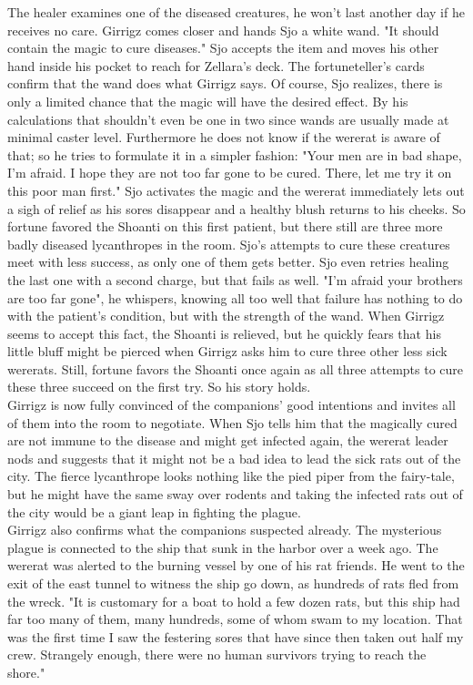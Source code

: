 The healer examines one of the diseased creatures, he won't last another day if he receives no care. Girrigz comes closer and hands Sjo a white wand. "It should contain the magic to cure diseases." Sjo accepts the item and moves his other hand inside his pocket to reach for Zellara's deck. The fortuneteller's cards confirm that the wand does what Girrigz says. Of course, Sjo realizes, there is only a limited chance that the magic will have the desired effect. By his calculations that shouldn't even be one in two since wands are usually made at minimal caster level. Furthermore he does not know if the wererat is aware of that; so he tries to formulate it in a simpler fashion: "Your men are in bad shape, I'm afraid. I hope they are not too far gone to be cured. There, let me try it on this poor man first." Sjo activates the magic and the wererat immediately lets out a sigh of relief as his sores disappear and a healthy blush returns to his cheeks. So fortune favored the Shoanti on this first patient, but there still are three more badly diseased lycanthropes in the room. Sjo's attempts to cure these creatures meet with less success, as only one of them gets better. Sjo even retries healing the last one with a second charge, but that fails as well. "I'm afraid your brothers are too far gone", he whispers, knowing all too well that failure has nothing to do with the patient's condition, but with the strength of the wand. When Girrigz seems to accept this fact, the Shoanti is relieved, but he quickly fears that his little bluff might be pierced when Girrigz asks him to cure three other less sick wererats. Still, fortune favors the Shoanti once again as all three attempts to cure these three succeed on the first try. So his story holds.\\

Girrigz is now fully convinced of the companions' good intentions and invites all of them into the room to negotiate. When Sjo tells him that the magically cured are not immune to the disease and might get infected again, the wererat leader nods and suggests that it might not be a bad idea to lead the sick rats out of the city. The fierce lycanthrope looks nothing like the pied piper from the fairy-tale, but he might have the same sway over rodents and taking the infected rats out of the city would be a giant leap in fighting the plague.\\

Girrigz also confirms what the companions suspected already. The mysterious plague is connected to the ship that sunk in the harbor over a week ago. The wererat was alerted to the burning vessel by one of his rat friends. He went to the exit of the east tunnel to witness the ship go down, as hundreds of rats fled from the wreck. "It is customary for a boat to hold a few dozen rats, but this ship had far too many of them, many hundreds, some of whom swam to my location. That was the first time I saw the festering sores that have since then taken out half my crew. Strangely enough, there were no human survivors trying to reach the shore."\\

